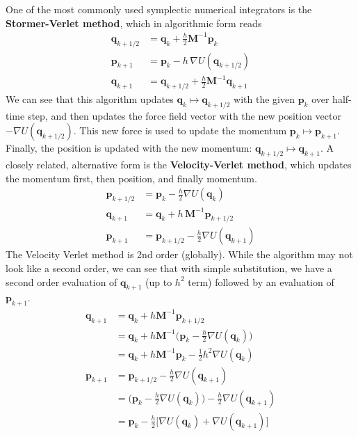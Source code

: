 \documentclass{article}
\begin{document}
      One of the most commonly used symplectic numerical integrators is the \textbf{Stormer-Verlet method}, which in algorithmic form reads 
      \begin{align*}
          \mathbf{q}_{k + 1/2} & = \mathbf{q}_k + \frac{h}{2} \mathbf{M}^{-1} \mathbf{p}_k \\
          \mathbf{p}_{k+1} & = \mathbf{p}_k - h\, \nabla U(\mathbf{q}_{k+1/2}) \\
          \mathbf{q}_{k+1} & = \mathbf{q}_{k+1/2} + \frac{h}{2} \mathbf{M}^{-1} \mathbf{q}_{k+1} 
      \end{align*}
      We can see that this algorithm updates $\mathbf{q}_k \mapsto \mathbf{q}_{k+1/2}$ with the given $\mathbf{p}_k$ over half-time step, and then updates the force field vector with the new position vector $- \nabla U(\mathbf{q}_{k + 1/2})$. This new force is used to update the momentum $\mathbf{p}_k \mapsto \mathbf{p}_{k+1}$. Finally, the position is updated with the new momentum: $\mathbf{q}_{k + 1/2} \mapsto \mathbf{q}_{k+1}$. A closely related, alternative form is the \textbf{Velocity-Verlet method}, which updates the momentum first, then position, and finally momentum. 
      \begin{align*}
          \mathbf{p}_{k + 1/2} & = \mathbf{p}_k - \frac{h}{2} \nabla U (\mathbf{q}_k) \\
          \mathbf{q}_{k+1} & = \mathbf{q}_k + h \, \mathbf{M}^{-1} \mathbf{p}_{k + 1/2} \\
          \mathbf{p}_{k + 1} & = \mathbf{p}_{k + 1/2} - \frac{h}{2} \nabla U (\mathbf{q}_{k+1}) 
      \end{align*}
      The Velocity Verlet method is 2nd order (globally). While the algorithm may not look like a second order, we can see that with simple substitution, we have a second order evaluation of $\mathbf{q}_{k+1}$ (up to $h^2$ term) followed by an evaluation of $\mathbf{p}_{k+1}$. 
      \begin{align*}
          \mathbf{q}_{k+1} & = \mathbf{q}_k + h \mathbf{M}^{-1} \mathbf{p}_{k + 1/2} \\
          & = \mathbf{q}_k + h \mathbf{M}^{-1} \bigg( \mathbf{p}_k - \frac{h}{2} \nabla U (\mathbf{q}_k) \bigg) \\
          & = \mathbf{q}_k + h \mathbf{M}^{-1} \mathbf{p}_k - \frac{1}{2} h^2 \nabla U(\mathbf{q}_k) \\
          \mathbf{p}_{k+1} & = \mathbf{p}_{k + 1/2} - \frac{h}{2} \nabla U (\mathbf{q}_{k+1}) \\
          & = \bigg(\mathbf{p}_k - \frac{h}{2} \nabla U(\mathbf{q}_k)\bigg) - \frac{h}{2} \nabla U(\mathbf{q}_{k+1}) \\
          & = \mathbf{p}_k - \frac{h}{2} \big[ \nabla U(\mathbf{q}_k) + \nabla U(\mathbf{q}_{k+1}) \big]
      \end{align*}
\end{document}
